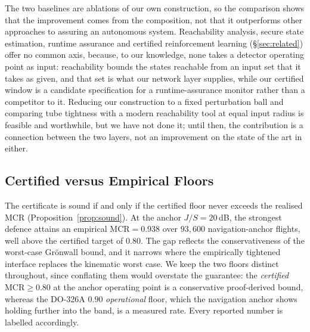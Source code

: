 \documentclass[conference,letterpaper,10pt]{IEEEtran}   %
\newcommand{\MCR}{\mathrm{MCR}}
\begin{document}
The two baselines are ablations of our own construction, so the comparison
shows that the improvement comes from the composition, not that it outperforms
other approaches to assuring an autonomous system. Reachability analysis,
secure state estimation, runtime assurance and certified reinforcement learning
(\S\ref{sec:related}) offer no common axis, because, to our knowledge, none
takes a detector operating point as input: reachability bounds the states reachable from an
input set that it takes as given, and that set is what our network layer
supplies, while our certified window is a candidate specification for a
runtime-assurance monitor rather than a competitor to it. Reducing our
construction to a fixed perturbation ball and comparing tube tightness with a
modern reachability tool at equal input radius is feasible and worthwhile, but
we have not done it; until then, the contribution is a connection between the
two layers, not an improvement on the state of the art in either.

\subsection{Certified versus Empirical Floors}
The certificate is sound if and only if the certified floor never exceeds the
realised MCR (Proposition~\ref{prop:sound}). At the anchor $J/S=20$\,dB, the
strongest defence attains an empirical $\MCR=0.938$ over $93{,}600$
navigation-anchor flights,
well above the certified target of $0.80$. The gap reflects the
conservativeness of the worst-case Gr\"onwall bound, and it narrows where the
empirically tightened interface replaces the kinematic worst case. We keep the
two floors distinct throughout, since conflating them would overstate the
guarantee: the \emph{certified} $\MCR\ge0.80$ at the anchor operating point is
a conservative proof-derived bound, whereas the DO-326A $0.90$
\emph{operational} floor, which the navigation anchor shows holding further into the
band, is a measured rate. Every reported number is labelled accordingly.

\begin{table}[t]
\centering
\caption{A representative cross-layer pairing, in which a detector-evading
time-delay attack still induces measurable navigation staleness. Values are
from the released artifact (harness simulation; $\gamma$ at its per-sample
supremum; navigation-anchor MCR).}
\label{tab:pairing}
\scriptsize
\renewcommand{\arraystretch}{1.05}

\end{table}
\end{document}
